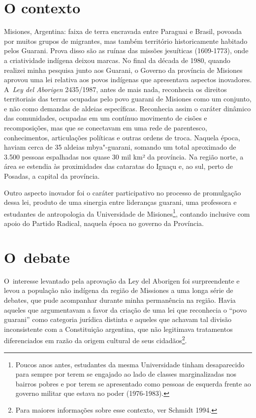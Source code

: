 \section{O contexto}

Misiones, Argentina: faixa de terra encravada entre Paraguai e Brasil,
povoada por muitos grupos de migrantes, mas também território
historicamente habitado pelos Guarani. Prova disso são as ruínas das
missões jesuíticas (1609-1773), onde a criatividade indígena deixou
marcas. No final da década de 1980, quando realizei minha pesquisa
junto aos Guarani, o Governo da província de Misiones aprovou uma lei
relativa aos povos indígenas que apresentava aspectos inovadores. A~\emph{Ley
del Aborigen} 2435/1987, antes de mais nada, reconhecia os direitos
territoriais das terras ocupadas pelo povo guarani de Misiones como um
conjunto, e não como demandas de aldeias específicas. Reconhecia assim
o caráter dinâmico das comunidades, ocupadas em um contínuo movimento
de cisões e recomposições, mas que se conectavam em uma rede de
parentesco, conhecimentos, articulações políticas e outras ordens de
troca. Naquela época, haviam cerca de 35 aldeias mbya"-guarani, somando
um total aproximado de 3.500 pessoas espalhadas nos quase 30 mil km² da
província. Na região norte, a área se estendia às proximidades das
cataratas do Iguaçu e, ao sul, perto de Posadas, a capital da
província.

Outro aspecto inovador foi o caráter participativo no processo de
promulgação dessa lei, produto de uma sinergia entre lideranças
guarani, uma professora e estudantes de antropologia da Universidade de
Misiones\footnote{Poucos anos antes, estudantes da mesma Universidade
tinham desaparecido para sempre por terem se engajado ao lado de
classes marginalizadas nos bairros pobres e por terem se apresentado
como pessoas de esquerda frente ao governo militar que estava no poder
(1976-1983).}, contando inclusive com apoio do Partido Radical, naquela
época no governo da Província. 

\section{O~debate}

O~interesse levantado pela aprovação da Ley del Aborigen foi
surpreendente e levou a população não indígena da região de Missiones a
uma longa série de debates, que pude acompanhar durante minha
permanência na região. Havia aqueles que argumentavam a favor da
criação de uma lei que reconhecia o ``povo guarani'' como categoria
jurídica distinta e aqueles que achavam tal divisão inconsistente com a
Constituição argentina, que não legitimava tratamentos diferenciados em
razão da origem cultural de seus cidadãos\footnote{Para maiores
informações sobre esse contexto, ver Schmidt 1994.}. 

